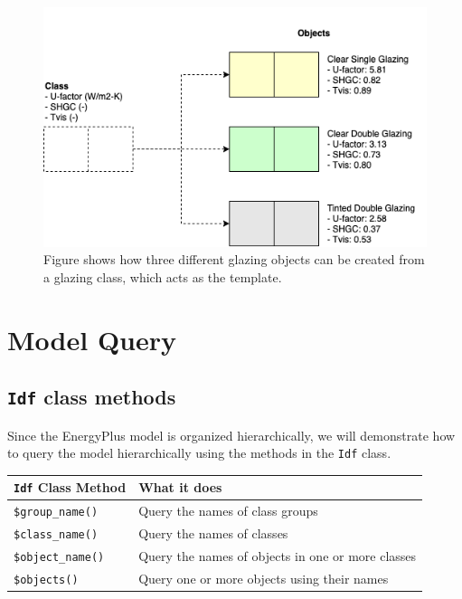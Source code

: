 \documentclass[
]{book}
\begin{document}
\begin{figure}

{\centering \includegraphics[width=0.8\linewidth]{figures/class_object} 

}

\caption{Figure shows how three different glazing objects can be created from a glazing class, which acts as the template.}\label{fig:class-object}
\end{figure}

\hypertarget{model-query}{%
\section{Model Query}\label{model-query}}

\hypertarget{idf-class-methods}{%
\subsection{\texorpdfstring{\texttt{Idf} class methods}{Idf class methods}}\label{idf-class-methods}}

Since the EnergyPlus model is organized hierarchically, we will demonstrate how to query the model hierarchically using the methods in the \texttt{Idf} class.

\begin{longtable}[]{@{}ll@{}}
\toprule
\texttt{Idf} Class Method & What it does \\
\midrule
\endhead
\texttt{\$group\_name()} & Query the names of class groups \\
\texttt{\$class\_name()} & Query the names of classes \\
\texttt{\$object\_name()} & Query the names of objects in one or more classes \\
\texttt{\$objects()} & Query one or more objects using their names \\
\bottomrule
\end{longtable}
\end{document}
